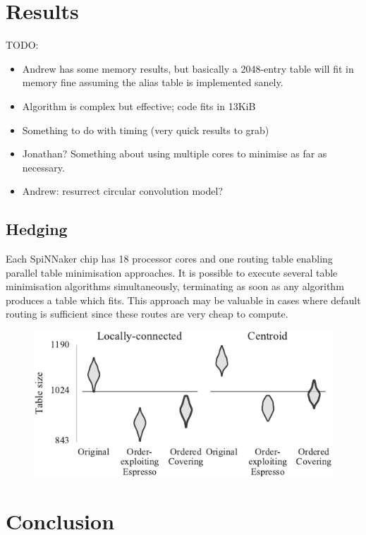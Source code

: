 \documentclass[conference]{IEEEtran}
\begin{document}
  \section{Results}

  TODO:
  \begin{itemize}
    \item Andrew has some memory results, but basically a 2048-entry table will fit in memory fine assuming the alias table is implemented sanely.
    \item Algorithm is complex but effective; code fits in 13KiB
    \item Something to do with timing (very quick results to grab)
    \item Jonathan? Something about using multiple cores to minimise as far as necessary.
    \item Andrew: resurrect circular convolution model?
  \end{itemize}
  
    \subsection{Hedging}
    
       Each SpiNNaker chip has 18 processor cores and one routing table enabling parallel table minimisation approaches.
       It is possible to execute several table minimisation algorithms simultaneously, terminating as soon as any algorithm produces a table which fits.
       This approach may be valuable in cases where default routing is sufficient since these routes are very cheap to compute.

\begin{figure}
  \centering
  \includegraphics{experiments/results_esp_and_oc}
\end{figure}

  \section{Conclusion}

\printbibliography
\end{document}
